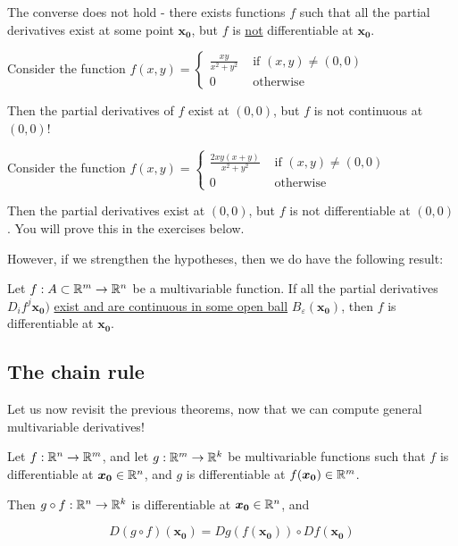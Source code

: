     
    \begin{remark}
    The converse does not hold - there exists functions $f$ such that all the partial derivatives exist at some point $\bm{x_0}$, but $f$ is \underline{not} differentiable at $\bm{x_0}$.
    \end{remark}    

\begin{example}
    Consider the function $f(x,y) = \left\{
		\begin{array}{ll}
			\frac{xy}{x^2 + y^2} & \text{ if } (x,y) \neq (0,0) \\
			0 & \text{ otherwise } 
		\end{array}
		\right.$

  Then the partial derivatives of $f$ exist at $(0,0)$, but $f$ is not continuous at $(0,0)$!
\end{example}


    \begin{example}
    Consider the function  $f(x,y) = \left\{
		\begin{array}{ll}
			\frac{2xy(x+y)}{x^2+y^2} & \text{ if } (x,y) \neq (0,0) \\
			0 & \text{ otherwise } 
		\end{array}
		\right.$

    Then the partial derivatives exist at $(0,0)$, but $f$ is not differentiable at $(0,0)$.  You will prove this in the exercises below.
\end{example}


However, if we strengthen the hypotheses, then we do have the following result:
    
    \begin{theorem}
    Let  $f : A \subset \mathbb{R}^m \to \mathbb{R}^n$ be a multivariable function.  If all the partial derivatives $D_if^j\bm{x_0})$ \underline{exist and are continuous in some open ball} $B_\varepsilon(\bm{x_0})$, then $f$ is differentiable at $\bm{x_0}$.
    \end{theorem}

\subsection{The chain rule}

Let us now revisit the previous theorems, now that we can compute general multivariable derivatives!

\begin{theorem}
    Let $f : \mathbb{R}^n \to \mathbb{R}^m$, and let $g: \mathbb{R}^m \to \mathbb{R}^k$ be multivariable functions such that $f$ is differentiable at $\bm{x_0} \in \mathbb{R}^n$, and $g$ is differentiable at $f(\bm{x_0}) \in \mathbb{R}^m$.
    
    \vspace{1em}
    Then $g \circ f : \mathbb{R}^n \to \mathbb{R}^k$ is differentiable at $\bm{x_0} \in \mathbb{R}^n$, and 
    
    $$D(g \circ f)(\bm{x_0}) = Dg(f(\bm{x_0})) \circ Df(\bm{x_0})$$
    
    \end{theorem}

